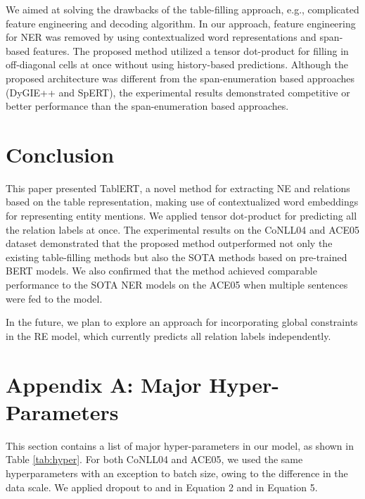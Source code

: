 \documentclass[11pt,a4paper]{article}
\begin{document}
We aimed at solving the drawbacks of the table-filling approach, e.g., complicated feature engineering and decoding algorithm. In our approach, feature engineering for NER was removed by using contextualized word representations and span-based features. The proposed method utilized a tensor dot-product for filling in off-diagonal cells at once without using history-based predictions.
Although the proposed architecture was different from the span-enumeration based approaches (DyGIE++ and SpERT), the experimental results demonstrated competitive or better performance than the span-enumeration based approaches.

\section{Conclusion}
\label{conclusion}

This paper presented TablERT, a novel method for extracting NE and relations based on the table representation, making use of contextualized word embeddings for representing entity mentions. We applied tensor dot-product for predicting all the relation labels at once. The experimental results on the CoNLL04 and ACE05 dataset demonstrated that the proposed method outperformed not only the existing table-filling methods but also the SOTA methods based on pre-trained BERT models. We also confirmed that the method achieved comparable performance to the SOTA NER models on the ACE05 when multiple sentences were fed to the model.

In the future, we plan to explore an approach for incorporating global constraints in the RE model, which currently predicts all relation labels independently. 



 



\newpage
\clearpage
\appendix

\section*{Appendix A: Major Hyper-Parameters}

This section contains a list of major hyper-parameters in our model, as shown in Table \ref{tab:hyper}. For both CoNLL04 and ACE05, we used the same hyperparameters with an exception to batch size, owing to the difference in the data scale. 
We applied dropout to  and  in Equation 2 and  in Equation 5.
\end{document}
